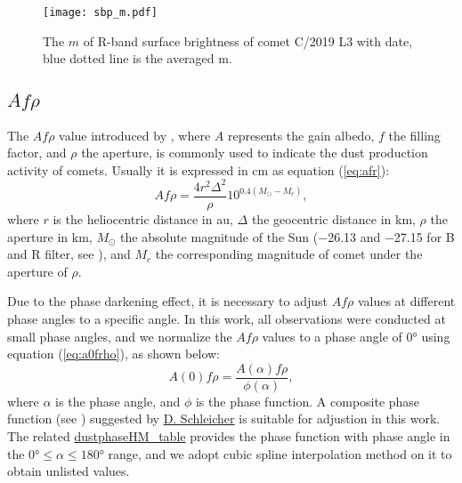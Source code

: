 \begin{figure}
    \centering
    \texttt{[image: sbp\_m.pdf]}
    \caption{The $m$ of R-band surface brightness of comet C/2019 L3 with date, blue dotted line is the averaged m. }
    \label{fig:sbp_m}
\end{figure}


\subsection{$Af\rho$}

The $Af\rho$ value introduced by \citet{ahearn_comet_1984}, where $A$ represents the gain albedo, $f$ the filling factor, and $\rho$ the aperture, is commonly used to indicate the dust production activity of comets. Usually it is expressed in \si{\cm} as equation (\ref{eq:afr}): 
\begin{equation}
    Af\rho = \frac{4 r^2 \Delta^2}{\rho} 10^{0.4(M_\odot - M_c)}, 
    \label{eq:afr}
\end{equation}
where $r$ is the heliocentric distance in \si{\astronomicalunit}, $\Delta$ the geocentric distance in \si{\km}, $\rho$ the aperture in \si{\km}, $M_\odot$ the absolute magnitude of the Sun (\si{\num{-26.13}} and \si{\num{-27.15}} for B and R filter, see \citealt{willmer_absolute_2018}), and $M_c$ the corresponding magnitude of comet under the aperture of $\rho$. 

Due to the phase darkening effect, it is necessary to adjust $Af\rho$ values at different phase angles to a specific angle. In this work, all observations were conducted at small phase angles, and we normalize the $Af\rho$ values to a phase angle of \ang{0} using equation (\ref{eq:a0frho}), as shown below:
\begin{equation}
    A(0)f\rho = \frac{A(\alpha)f\rho}{\phi(\alpha)}, \label{eq:a0frho}
\end{equation}
where $\alpha$ is the phase angle, and $\phi$ is the phase function. A composite phase function (see \citealt{schleicher_composition_2011, marcus_forward-scattering_2007}) suggested by {\href{https://asteroid.lowell.edu/comet/dustphase.html}{D. Schleicher}} is suitable for adjustion in this work. The related {\href{https://asteroid.lowell.edu/comet/dustphaseHM_table.html}{dustphaseHM\_table}} provides the phase function with phase angle in the $\ang{0} \leqslant \alpha \leqslant \ang{180}$ range, and we adopt cubic spline interpolation method on it to obtain unlisted values. 

